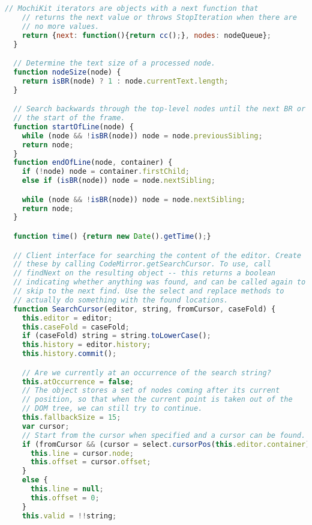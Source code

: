\begin{lstlisting}[language=Javascript]
    // MochiKit iterators are objects with a next function that
    // returns the next value or throws StopIteration when there are
    // no more values.
    return {next: function(){return cc();}, nodes: nodeQueue};
  }

  // Determine the text size of a processed node.
  function nodeSize(node) {
    return isBR(node) ? 1 : node.currentText.length;
  }

  // Search backwards through the top-level nodes until the next BR or
  // the start of the frame.
  function startOfLine(node) {
    while (node && !isBR(node)) node = node.previousSibling;
    return node;
  }
  function endOfLine(node, container) {
    if (!node) node = container.firstChild;
    else if (isBR(node)) node = node.nextSibling;

    while (node && !isBR(node)) node = node.nextSibling;
    return node;
  }

  function time() {return new Date().getTime();}

  // Client interface for searching the content of the editor. Create
  // these by calling CodeMirror.getSearchCursor. To use, call
  // findNext on the resulting object -- this returns a boolean
  // indicating whether anything was found, and can be called again to
  // skip to the next find. Use the select and replace methods to
  // actually do something with the found locations.
  function SearchCursor(editor, string, fromCursor, caseFold) {
    this.editor = editor;
    this.caseFold = caseFold;
    if (caseFold) string = string.toLowerCase();
    this.history = editor.history;
    this.history.commit();

    // Are we currently at an occurrence of the search string?
    this.atOccurrence = false;
    // The object stores a set of nodes coming after its current
    // position, so that when the current point is taken out of the
    // DOM tree, we can still try to continue.
    this.fallbackSize = 15;
    var cursor;
    // Start from the cursor when specified and a cursor can be found.
    if (fromCursor && (cursor = select.cursorPos(this.editor.container))) {
      this.line = cursor.node;
      this.offset = cursor.offset;
    }
    else {
      this.line = null;
      this.offset = 0;
    }
    this.valid = !!string;


\end{lstlisting}
